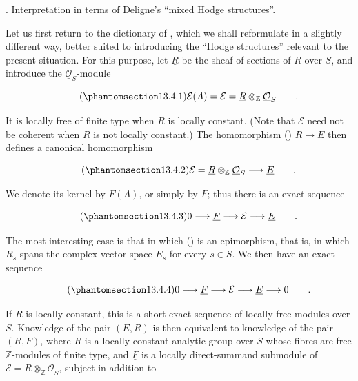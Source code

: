 \medskip
\noindent
{}. \underline{Interpretation in terms of Deligne's} ``\underline{mixed Hodge
structures}''.

Let us first return to the dictionary of , which we shall
reformulate in a slightly different way, better suited to introducing
the ``Hodge structures'' relevant to the present situation.  For this
purpose, let $\underline R$ be the sheaf of sections of $R$ over $S$, and
introduce the $\underline{\mathcal O}_S$-module

\begin{equation}\tag{\SGARefTarget{sga7.sga7i.eix.n13-4-1}{13.4.1}}
 \mathcal E(A)=\mathcal E=
 \underline R\otimes_{\mathbb Z}\underline{\mathcal O}_S\qquad .
\end{equation}

\noindent
It is locally free of finite type when $R$ is locally constant.  (Note
that $\mathcal E$ need not be coherent when $R$ is not locally
constant.)  The homomorphism ()
$\underline R\longrightarrow\underline E$ then defines a canonical
homomorphism

\begin{equation}\tag{\SGARefTarget{sga7.sga7i.eix.n13-4-2}{13.4.2}}
 \mathcal E=\underline R\otimes_{\mathbb Z}
 \underline{\mathcal O}_S\longrightarrow\underline E\qquad .
\end{equation}

\noindent
We denote its kernel by $\underline F(A)$, or simply by $\underline F$;
thus there is an exact sequence

\begin{equation}\tag{\SGARefTarget{sga7.sga7i.eix.n13-4-3}{13.4.3}}
 0\longrightarrow\underline F\longrightarrow\mathcal E
 \longrightarrow\underline E\qquad .
\end{equation}

\noindent
The most interesting case is that in which () is an epimorphism,
that is, in which $R_s$ spans the complex vector space $E_s$ for every
$s\in S$.  We then have an exact sequence

\begin{equation}\tag{\SGARefTarget{sga7.sga7i.eix.n13-4-4}{13.4.4}}
 0\longrightarrow\underline F\longrightarrow\mathcal E
 \longrightarrow\underline E\longrightarrow0\qquad .
\end{equation}

\noindent
If $R$ is locally constant, this is a short exact sequence of locally
free modules over $S$.  Knowledge of the pair $(E,R)$ is then equivalent
to knowledge of the pair $(R,\underline F)$, where $R$ is a locally
constant analytic group over $S$ whose fibres are free $\mathbb Z$-modules
of finite type, and $\underline F$ is a locally direct-summand submodule
of $\mathcal E=\underline R\otimes_{\mathbb Z}
\underline{\mathcal O}_S$, subject in addition to

